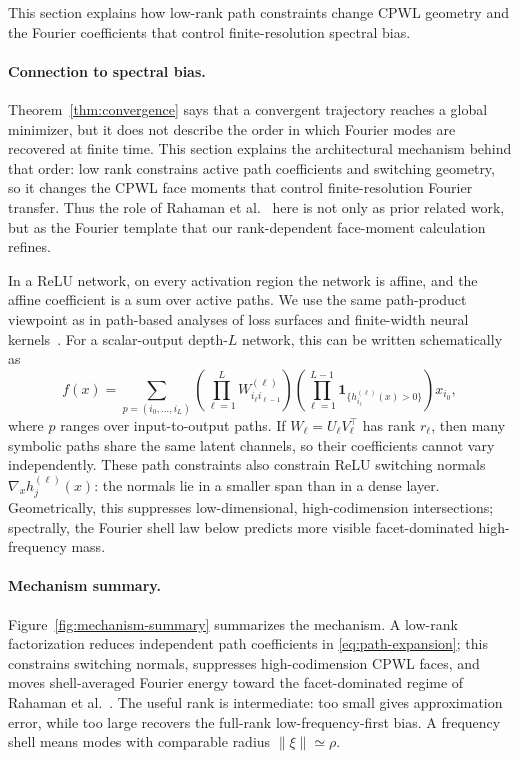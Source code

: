 \documentclass{article}
\begin{document}
This section explains how low-rank path constraints change CPWL geometry and the Fourier coefficients that control finite-resolution spectral bias.

\paragraph{Connection to spectral bias.}
Theorem~\ref{thm:convergence} says that a convergent trajectory reaches a global minimizer, but it does not describe the order in which Fourier modes are recovered at finite time. This section explains the architectural mechanism behind that order: low rank constrains active path coefficients and switching geometry, so it changes the CPWL face moments that control finite-resolution Fourier transfer. Thus the role of Rahaman et al.~\cite{rahaman2019} here is not only as prior related work, but as the Fourier template that our rank-dependent face-moment calculation refines.

In a ReLU network, on every activation region the network is affine, and the affine coefficient is a sum over active paths. We use the same path-product viewpoint as in path-based analyses of loss surfaces and finite-width neural kernels~\cite{choromanska2015,hanin2019finite}. For a scalar-output depth-$L$ network, this can be written schematically as
\begin{equation}
f(x)=
\sum_{p=(i_0,\ldots,i_L)}
\left(
\prod_{\ell=1}^{L} W^{(\ell)}_{i_\ell i_{\ell-1}}
\right)
\left(
\prod_{\ell=1}^{L-1}\mathbf 1_{\{h^{(\ell)}_{i_\ell}(x)>0\}}
\right)
x_{i_0},
\label{eq:path-expansion}
\end{equation}
where $p$ ranges over input-to-output paths. If $W_\ell=U_\ell V_\ell^\top$ has rank $r_\ell$, then many symbolic paths share the same latent channels, so their coefficients cannot vary independently. These path constraints also constrain ReLU switching normals $\nabla_x h^{(\ell)}_j(x)$: the normals lie in a smaller span than in a dense layer. Geometrically, this suppresses low-dimensional, high-codimension intersections; spectrally, the Fourier shell law below predicts more visible facet-dominated high-frequency mass.

\paragraph{Mechanism summary.}
Figure~\ref{fig:mechanism-summary} summarizes the mechanism. A low-rank factorization reduces independent path coefficients in \eqref{eq:path-expansion}; this constrains switching normals, suppresses high-codimension CPWL faces, and moves shell-averaged Fourier energy toward the facet-dominated regime of Rahaman et al.~\cite{rahaman2019}. The useful rank is intermediate: too small gives approximation error, while too large recovers the full-rank low-frequency-first bias. A frequency shell means modes with comparable radius $\|\xi\|\simeq\rho$.
\end{document}
